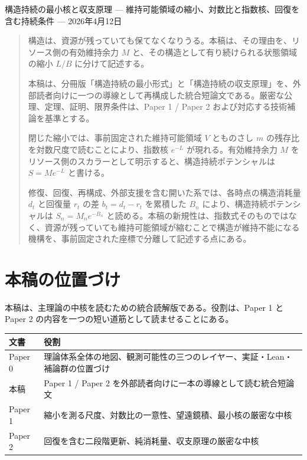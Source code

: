 \documentclass[12pt,a4paper]{article}
\begin{document}
\PaperTitleBlock
  {構造持続の最小核と収支原理}
  {— 維持可能領域の縮小、対数比と指数核、回復を含む持続条件 —}
  {2026年4月12日}

\begin{abstract}
構造は、資源が残っていても保てなくなりうる。本稿は、その理由を、リソース側の有効維持余力 \(M\) と、その構造として有り続けられる状態領域の縮小 \(L/B\) に分けて記述する。

本稿は、分冊版「構造持続の最小形式」と「構造持続の収支原理」を、外部読者向けに一つの導線として再構成した統合短論文である。厳密な公理、定理、証明、限界条件は、Paper 1 / Paper 2 および対応する技術補論を基準とする。

閉じた縮小では、事前固定された維持可能領域 \(V\) とものさし \(m\) の残存比を対数尺度で読むことにより、指数核 \(e^{-L}\) が現れる。有効維持余力 \(M\) をリソース側のスカラーとして明示すると、構造持続ポテンシャルは \(S=Me^{-L}\) と書ける。

修復、回復、再構成、外部支援を含む開いた系では、各時点の構造消耗量 \(d_{t}\) と回復量 \(r_{t}\) の差 \(b_{t}=d_{t}-r_{t}\) を累積した \(B_{n}\) により、構造持続ポテンシャルは \(S_{n}=M_{n} e^{-B_{n}}\) と読める。本稿の新規性は、指数式そのものではなく、資源が残っていても維持可能領域が縮むことで構造が維持不能になる機構を、事前固定された座標で分離して記述する点にある。
\end{abstract}

\section{本稿の位置づけ}\label{ux672cux7a3fux306eux4f4dux7f6eux3065ux3051}

本稿は、主理論の中核を読むための統合読解版である。役割は、Paper 1 と Paper 2 の内容を一つの短い道筋として読ませることにある。

{\def\LTcaptype{table} %
\begin{longtable}[]{@{}
  >{\raggedright\arraybackslash}p{}
  >{\raggedright\arraybackslash}p{}@{}}
\toprule\noalign{}
\begin{minipage}[b]{\linewidth}\raggedright
文書
\end{minipage} & \begin{minipage}[b]{\linewidth}\raggedright
役割
\end{minipage} \\
\midrule\noalign{}
\endhead
\bottomrule\noalign{}
\endlastfoot
Paper 0 & 理論体系全体の地図、観測可能性の三つのレイヤー、実証・Lean・補論群の位置づけ \\
本稿 & Paper 1 / Paper 2 を外部読者向けに一本の導線として読む統合短論文 \\
Paper 1 & 縮小を測る尺度、対数比の一意性、望遠鏡積、最小核の厳密な中核 \\
Paper 2 & 回復を含む二段階更新、純消耗量、収支原理の厳密な中核 \\
\end{longtable}
}
\end{document}
